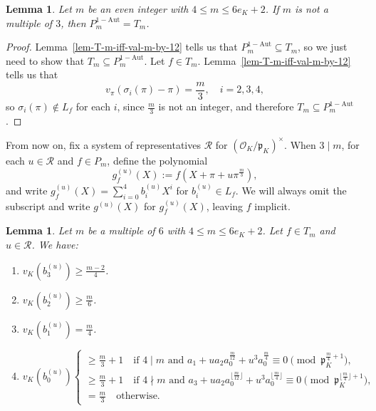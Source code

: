 \documentclass[11pt]{amsart}
\theoremstyle{theorem}
\newtheorem{lemma}[theorem]{Lemma}
\theoremstyle{example}
\theoremstyle{definition}
\numberwithin{theorem}{section}
\numberwithin{theorem}{section}
\newcommand{\co}{\mathcal{O}}
\newcommand{\p}{\mathfrak{p}}
\newcommand{\oneaut}{\mathrm{1-Aut}}
\begin{document}
\begin{lemma}
    \label{lem-Pm1-eq-Tm-if-m-not-multiple-of-3}
    Let $m$ be an even integer with $4 \leq m \leq 6e_K + 2$. If $m$ is not a multiple of $3$, then $P_m^{\oneaut} = T_m$. 
\end{lemma}
\begin{proof}
    Lemma~\ref{lem-T-m-iff-val-m-by-12} tells us that $P_m^{\oneaut} \subseteq T_m$, so we just need to show that $T_m \subseteq P_m^{\oneaut}$. Let $f \in T_m$. Lemma~\ref{lem-T-m-iff-val-m-by-12} tells us that 
    $$
    v_\pi(\sigma_i(\pi) - \pi) = \frac{m}{3},\quad i=2,3,4,
    $$
    so $\sigma_i(\pi) \not \in L_f$ for each $i$, since $\frac{m}{3}$ is not an integer, and therefore $T_m \subseteq P_m^{\oneaut}$. 
\end{proof}

From now on, fix a system of representatives $\mathcal{R}$ for $(\co_K/\p_K)^\times$. When $3 \mid m$, for each $u \in \mathcal{R}$ and $f \in P_m$, define the polynomial 
$$
g_f^{(u)}(X) := f(X + \pi + u\pi^{\frac{m}{3}}),
$$
and write $g_f^{(u)}(X) = \sum_{i=0}^4 b_i^{(u)}X^i$ for $b_i^{(u)} \in L_f$. We will always omit the subscript and write $g^{(u)}(X)$ for $g_f^{(u)}(X)$, leaving $f$ implicit. 

\begin{lemma}
    \label{lem-vals-of-bi}
    Let $m$ be a multiple of $6$ with $4 \leq m \leq 6e_K + 2$. Let $f \in T_m$ and $u\in\mathcal{R}$. We have: 
    \begin{enumerate} 
        \item $v_K(b_3^{(u)}) \geq \frac{m-2}{4}$.
        \item $v_K(b_2^{(u)}) \geq \frac{m}{6}$.
        \item $v_K(b_1^{(u)}) = \frac{m}{4}$. 
        \item $$
    v_K(b_0^{(u)}) \begin{cases}
        \geq \frac{m}{3} + 1 \quad\text{if $4\mid m$ and $a_1 + ua_2a_0^{ \frac{m}{12}} + u^3 a_0^{ \frac{m}{4}}\equiv 0 \pmod{\p_K^{ \frac{m}{4} + 1}}$},
        \\
        \geq \frac{m}{3} + 1 \quad\text{if $4\nmid m$ and $a_3 + ua_2a_0^{\lfloor \frac{m}{12}\rfloor} + u^3a_0^{\lfloor \frac{m}{4}\rfloor}\equiv 0\pmod{\p_K^{\lfloor \frac{m}{4}\rfloor + 1}}$},
        \\
        = \frac{m}{3} \quad\text{otherwise}. 
    \end{cases}
    $$
\end{enumerate}
\end{lemma}
\end{document}
